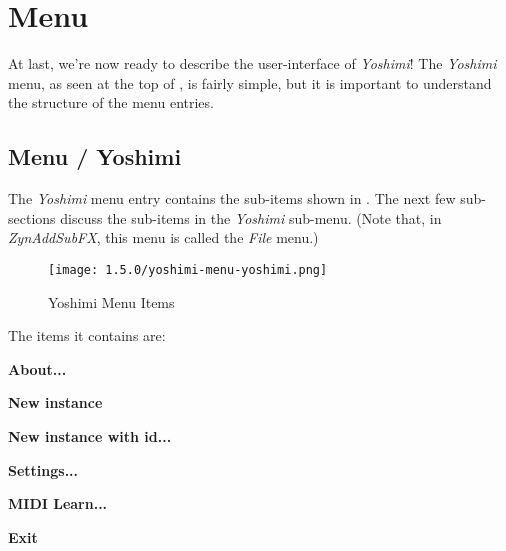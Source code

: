 %
%
%

\section{Menu}
\label{sec:menu}

   At last, we're now ready to describe the user-interface of \textsl{Yoshimi}!
   The \textsl{Yoshimi} menu, as seen at the top of
   ,
   is fairly simple, but it is important to understand the
   structure of the menu entries.

\subsection{Menu / Yoshimi}
\label{subsec:menu_yoshimi}

   The \textsl{Yoshimi}
   menu entry contains the sub-items shown in
   .
   The next few sub-sections discuss the sub-items in the 
   \textsl{Yoshimi} sub-menu.
   (Note that, in \textsl{ZynAddSubFX}, this menu is called the
   \textsl{File} menu.)

\begin{figure}[H]
   \centering 
   \texttt{[image: 1.5.0/yoshimi-menu-yoshimi.png]}
   \caption{Yoshimi Menu Items}
   \label{fig:yoshimi_menu_items}
\end{figure}

   The items it contains are:

   \begin{enumber}
      \item \textbf{About...}
      \item \textbf{New instance}
      \item \textbf{New instance with id...}
      \item \textbf{Settings...}
      \item \textbf{MIDI Learn...}
      \item \textbf{Exit}
   \end{enumber}

